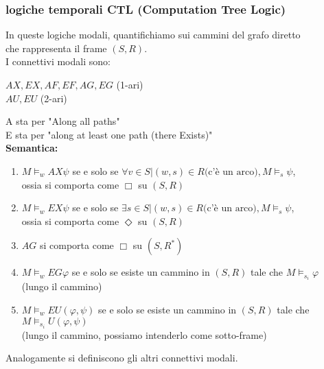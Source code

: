 \documentclass[a4paper,12pt]{article}
\theoremstyle{def}
\theoremstyle{prop}
\theoremstyle{esempio}
\theoremstyle{dimostrazione}
\theoremstyle{teo}
\theoremstyle{osservazione}
\begin{document}
\subsubsection{logiche temporali CTL (Computation Tree Logic)}
In queste logiche modali, quantifichiamo sui cammini del grafo diretto\\
che rappresenta il frame \((S,R)\).\\
I connettivi modali sono:
\begin{center}
	\(AX, EX, AF, EF, AG, EG\) (1-ari)\\
	\(AU, EU\) (2-ari)
\end{center}
A sta per "Along all paths"\\
E sta per "along at least one path (there Exists)"\\
\textbf{Semantica:}
\begin{enumerate}
	\item \(M \vDash_w AX \psi \) se e solo se \(\forall v \in S | (w,s) \in R \text{(c'è un arco)} , M \vDash_s \psi\),\\
	 		ossia si comporta come \(\Box\) su \((S,R)\)
	\item \(M \vDash_w EX \psi \) se e solo se \(\exists s \in S | (w,s) \in R \text{(c'è un arco)} , M \vDash_s \psi\),\\
	 		ossia si comporta come \(\Diamond\) su \((S,R)\)
	\item \(AG\) si comporta come \(\Box\) su \((S,R^*)\)
	\item \(M \vDash_w EG \varphi\) se e solo se esiste un cammino in \((S,R)\) tale che \(M \vDash_{s_i} \varphi\)\\
			(lungo il cammino)
	\item \(M \vDash_w EU (\varphi, \psi)\) se e solo se esiste un cammino in \((S,R)\) tale che \(M \vDash_{s_i} U(\varphi, \psi)\)\\
			(lungo il cammino, possiamo intenderlo come sotto-frame)
\end{enumerate}
Analogamente si definiscono gli altri connettivi modali.
\end{document}
